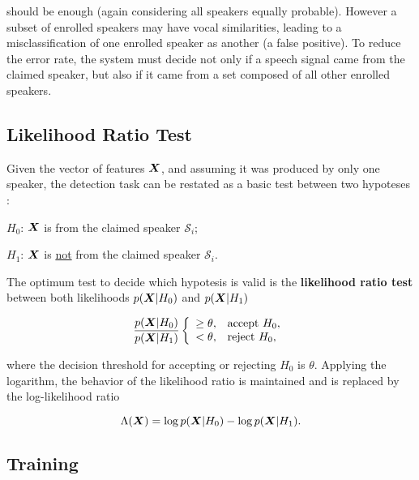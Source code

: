 \noindent should be enough (again considering all speakers equally probable). However a subset of enrolled speakers may have vocal similarities, leading to a misclassification of one enrolled speaker as another (a false positive). To reduce the error rate, the system must decide not only if a speech signal came from the claimed speaker, but also if it came from a set composed of all other enrolled speakers.

\subsection{Likelihood Ratio Test}

Given the vector of features $\boldsymbol{X}$, and assuming it was produced by only one speaker, the detection task can be restated as a basic test between two hypoteses :

\begin{description}\itemsep0pt
    \item $H_0$: $\boldsymbol{X}$ is from the claimed speaker $\mathcal{S}_i$;
    \item $H_1$: $\boldsymbol{X}$ is \underline{not} from the claimed speaker $\mathcal{S}_i$.
\end{description}

\noindent The optimum test to decide which hypotesis is valid is the \textbf{likelihood ratio test} between both likelihoods $p(\boldsymbol{X}|H_0)$ and $p(\boldsymbol{X}|H_1)$

\begin{equation}
    \frac{\postpdf{\dvec{X}}{H_0}}{\postpdf{\dvec{X}}{H_1}} \verifytestB{\theta}{H_0}
    \label{eq:likelihood-ratio-test}
\end{equation}

\noindent where the decision threshold for accepting or rejecting $H_0$ is $\theta$. Applying the logarithm, the behavior of the likelihood ratio is maintained and  is replaced by the log-likelihood ratio

\begin{equation}
    \Lambda(\dvec{X}) = \log \postpdf{\dvec{X}}{H_0} - \log \postpdf{\dvec{X}}{H_1}.
    \label{eq:log-likelihood-ratio-test}
\end{equation}

\subsection{Training}

